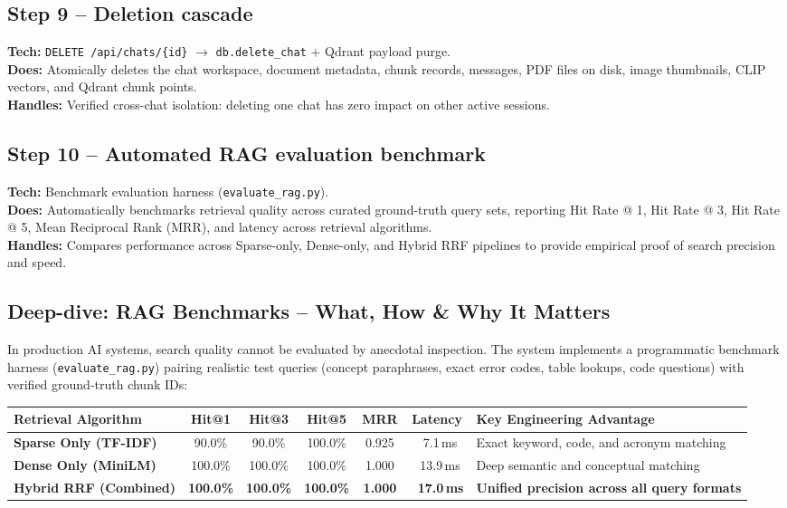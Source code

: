 \documentclass[11pt,a4paper]{article}
\begin{document}
\subsection{Step 9 -- Deletion cascade}
\textbf{Tech:} \texttt{DELETE /api/chats/\{id\}} $\rightarrow$ \texttt{db.delete\_chat} + Qdrant payload purge.\\
\textbf{Does:} Atomically deletes the chat workspace, document metadata, chunk records, messages, PDF files on disk, image thumbnails, CLIP vectors, and Qdrant chunk points.\\
\textbf{Handles:} Verified cross-chat isolation: deleting one chat has zero impact on other active sessions.

\subsection{Step 10 -- Automated RAG evaluation benchmark}
\textbf{Tech:} Benchmark evaluation harness (\texttt{evaluate\_rag.py}).\\
\textbf{Does:} Automatically benchmarks retrieval quality across curated ground-truth query sets, reporting Hit Rate @ 1, Hit Rate @ 3, Hit Rate @ 5, Mean Reciprocal Rank (MRR), and latency across retrieval algorithms.\\
\textbf{Handles:} Compares performance across Sparse-only, Dense-only, and Hybrid RRF pipelines to provide empirical proof of search precision and speed.

\subsection{Deep-dive: RAG Benchmarks -- What, How \& Why It Matters}
In production AI systems, search quality cannot be evaluated by anecdotal inspection. The system implements a programmatic benchmark harness (\texttt{evaluate\_rag.py}) pairing realistic test queries (concept paraphrases, exact error codes, table lookups, code questions) with verified ground-truth chunk IDs:

{\footnotesize
\begin{center}
\begin{tabular}{@{}lcccccp{3.8cm}@{}}
\toprule
Retrieval Algorithm & Hit@1 & Hit@3 & Hit@5 & MRR & Latency & Key Engineering Advantage \\
\midrule
\textbf{Sparse Only (TF-IDF)} & 90.0\% & 90.0\% & 100.0\% & 0.925 & ~7.1\,ms & Exact keyword, code, and acronym matching \\
\textbf{Dense Only (MiniLM)} & 100.0\% & 100.0\% & 100.0\% & 1.000 & ~13.9\,ms & Deep semantic and conceptual matching \\
\textbf{Hybrid RRF (Combined)} & \textbf{100.0\%} & \textbf{100.0\%} & \textbf{100.0\%} & \textbf{1.000} & \textbf{~17.0\,ms} & \textbf{Unified precision across all query formats} \\
\bottomrule
\end{tabular}
\end{center}
}
\end{document}
